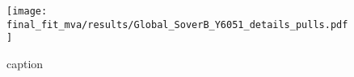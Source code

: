 \begin{figure}[!htbp]
	\centering
	\texttt{[image: final\_fit\_mva/results/Global\_SoverB\_Y6051\_details\_pulls.pdf]}
  \caption{caption}
  \label{fig:sobplot}
\end{figure}